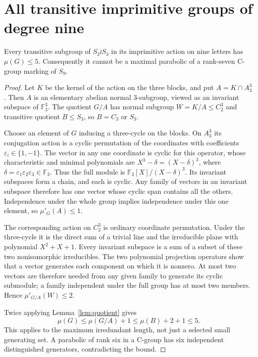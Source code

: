 \section{All transitive imprimitive groups of degree nine}
\begin{theorem}\label{thm:nine}
Every transitive subgroup of $S_3\wr S_3$ in its imprimitive action
on nine letters has $\mu(G)\leq5$. Consequently it cannot be a
maximal parabolic of a rank-seven C-group marking of $S_9$.
\end{theorem}
\begin{proof}
Let $K$ be the kernel of the action on the three blocks, and put
$A=K\cap A_3^3$. Then $A$ is an elementary abelian normal 3-subgroup,
viewed as an invariant subspace of $\mathbb F_3^3$. The quotient
$G/A$ has normal subgroup $W=K/A\leq C_2^3$ and transitive quotient
$B\leq S_3$, so $B=C_3$ or $S_3$.

Choose an element of $G$ inducing a three-cycle on the blocks.
On $A_3^3$ its conjugation action is a cyclic permutation of the
coordinates with coefficients $\varepsilon_i\in\{1,-1\}$.
The vector in any one coordinate is cyclic for this operator, whose
characteristic and minimal polynomials are
$X^3-\delta=(X-\delta)^3$, where $\delta=\varepsilon_1\varepsilon_2
\varepsilon_3\in\mathbb F_3$. Thus the full module is
$\mathbb F_3[X]/(X-\delta)^3$. Its invariant subspaces form a chain,
and each is cyclic. Any family of vectors in an invariant subspace
therefore has one vector whose cyclic span contains all the others.
Independence under the whole group implies independence under this
one element, so $\mu'_G(A)\leq1$.

The corresponding action on $C_2^3$ is ordinary coordinate permutation.
Under the three-cycle it is the direct sum of a trivial line and the
irreducible plane with polynomial $X^2+X+1$. Every invariant subspace
is a sum of a subset of these two nonisomorphic irreducibles. The two
polynomial projection operators show that a vector generates each
component on which it is nonzero. At most two vectors are therefore
needed from any given family to generate its cyclic submodule; a
family independent under the full group has at most two members.
Hence $\mu'_{G/A}(W)\leq2$.

Twice applying Lemma~\ref{lem:quotient} gives
\[
 \mu(G)\leq\mu(G/A)+1\leq\mu(B)+2+1\leq5.
\]
This applies to the maximum irredundant length, not just a selected
small generating set. A parabolic of rank six in a C-group has six
independent distinguished generators, contradicting the bound.
\end{proof}

